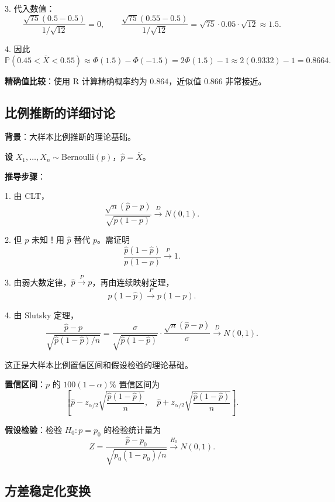 3. 代入数值：
\[
\frac{\sqrt{75}(0.5 - 0.5)}{1/\sqrt{12}} = 0,\qquad \frac{\sqrt{75}(0.55 - 0.5)}{1/\sqrt{12}} = \sqrt{75} \cdot 0.05 \cdot \sqrt{12} \approx 1.5.
\]

4. 因此
\[
\mathbb{P}(0.45 < \overline{X} < 0.55) \approx \Phi(1.5) - \Phi(-1.5) = 2\Phi(1.5) - 1 \approx 2(0.9332) - 1 = 0.8664.
\]

\textbf{精确值比较}：使用 R 计算精确概率约为 $0.864$，近似值 $0.866$ 非常接近。

\subsection{比例推断的详细讨论}\label{sec:proportion-inference}

\textbf{背景}：大样本比例推断的理论基础。

\textbf{设} $X_1, \ldots, X_n \sim \mathrm{Bernoulli}(p)$，$\widehat{p} = \overline{X}$。

\textbf{推导步骤}：

1. 由 CLT，
\[
\frac{\sqrt{n}(\widehat{p} - p)}{\sqrt{p(1-p)}} \xrightarrow{D} N(0,1).
\label{eq:proportion-clt-full}
\]

2. 但 $p$ 未知！用 $\widehat{p}$ 替代 $p$。需证明
\[
\frac{\widehat{p}(1 - \widehat{p})}{p(1-p)} \xrightarrow{P} 1.
\label{eq:proportion-ratio}
\]

3. 由弱大数定律，$\widehat{p} \xrightarrow{P} p$，再由连续映射定理，
\[
\widehat{p}(1 - \widehat{p}) \xrightarrow{P} p(1-p).
\]

4. 由 Slutsky 定理，
\[
\frac{\widehat{p} - p}{\sqrt{\widehat{p}(1-\widehat{p})/n}} = \frac{\sigma}{\sqrt{\widehat{p}(1-\widehat{p})}} \cdot \frac{\sqrt{n}(\widehat{p} - p)}{\sigma} \xrightarrow{D} N(0,1).
\label{eq:proportion-slutsky}
\]

这正是大样本比例置信区间和假设检验的理论基础。

\textbf{置信区间}：$p$ 的 $100(1-\alpha)\%$ 置信区间为
\[
\left[\widehat{p} - z_{\alpha/2}\sqrt{\frac{\widehat{p}(1-\widehat{p})}{n}},\quad \widehat{p} + z_{\alpha/2}\sqrt{\frac{\widehat{p}(1-\widehat{p})}{n}}\right].
\label{eq:proportion-ci}
\]

\textbf{假设检验}：检验 $H_0: p = p_0$ 的检验统计量为
\[
Z = \frac{\widehat{p} - p_0}{\sqrt{p_0(1-p_0)/n}} \xrightarrow{H_0} N(0,1).
\label{eq:proportion-test}
\]

\subsection{方差稳定化变换}\label{sec:variance-stabilizing}

